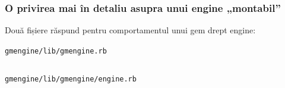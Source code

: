 \documentclass[compress]{beamer}
\begin{document}
\begin{frame}
\frametitle{O privirea mai în detaliu asupra unui engine „montabil”}

Două fișiere răspund pentru comportamentul unui gem drept engine:
\begin{itemize}
    \begin{item}
      \texttt{gmengine/lib/gmengine.rb}
      \inputminted[fontsize=\tiny,gobble=0,linenos=true,firstline=0,lastline=0]{ruby}{code/gmengine/lib/gmengine.rb}
    \end{item}
    \begin{item}
      \texttt{gmengine/lib/gmengine/engine.rb}
      \inputminted[fontsize=\tiny,gobble=0,linenos=true,firstline=0,lastline=0]{ruby}{code/gmengine/lib/gmengine/engine.rb}
    \end{item}
\end{itemize}
\end{frame}
\end{document}
